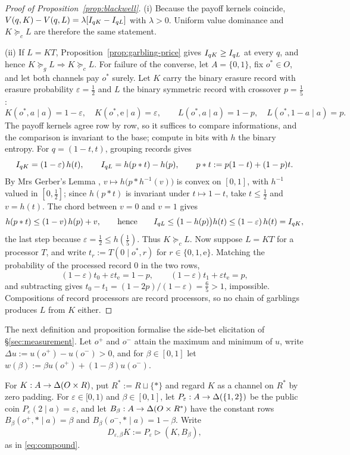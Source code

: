 \begin{proof}[Proof of Proposition~\ref{prop:blackwell}]
(i) Because the payoff kernels coincide,
$V(q,K)-V(q,L)=\lambda[I_{qK}-I_{qL}]$ with $\lambda>0$.  Uniform value dominance and
$K\succeq_cL$ are therefore the same statement.

(ii) If $L=KT$, Proposition~\ref{prop:garbling-price} gives $I_{qK}\ge I_{qL}$ at every $q$, and hence
$K\succeq_gL\Rightarrow K\succeq_cL$.  For failure of the converse, let $A=\{0,1\}$, fix $o^\ast\in O$, and let
both channels pay $o^\ast$ surely.  Let $K$ carry the binary
erasure record with erasure probability $\varepsilon=\tfrac12$ and $L$ the binary symmetric record with crossover
$p=\tfrac15$:
\[
 K(o^\ast,a\mid a)=1-\varepsilon,\quad K(o^\ast,\mathrm e\mid a)=\varepsilon,
 \qquad
 L(o^\ast,a\mid a)=1-p,\quad L(o^\ast,1-a\mid a)=p.
\]
The payoff kernels agree row by row, so it suffices to compare informations, and the comparison is invariant to the
base; compute in bits with $h$ the binary entropy.  For $q=(1-t,t)$, grouping records gives
\[
 I_{qK}=(1-\varepsilon)\,h(t),
 \qquad
 I_{qL}=h(p\ast t)-h(p),
 \qquad p\ast t:=p(1-t)+(1-p)t.
\]
By Mrs Gerber's Lemma \cite{WynerZiv1973}, $v\mapsto h\bigl(p\ast h^{-1}(v)\bigr)$ is convex on $[0,1]$, with
$h^{-1}$ valued in $[0,\tfrac12]$; since $h(p\ast t)$ is invariant under $t\mapsto1-t$, take $t\le\tfrac12$ and
$v=h(t)$.  The chord between $v=0$ and $v=1$ gives
\[
 h(p\ast t)\le(1-v)\,h(p)+v,
 \qquad\text{hence}\qquad
 I_{qL}\le\bigl(1-h(p)\bigr)h(t)\le(1-\varepsilon)\,h(t)=I_{qK},
\]
the last step because $\varepsilon=\tfrac12\le h(\tfrac15)$.  Thus $K\succeq_cL$.  Now suppose $L=KT$ for a
processor $T$, and write $t_r:=T(0\mid o^\ast,r)$ for $r\in\{0,1,\mathrm e\}$.  Matching the probability of the
processed record $0$ in the two rows,
\[
 (1-\varepsilon)t_0+\varepsilon t_{\mathrm e}=1-p,
 \qquad
 (1-\varepsilon)t_1+\varepsilon t_{\mathrm e}=p,
\]
and subtracting gives $t_0-t_1=(1-2p)/(1-\varepsilon)=\tfrac65>1$, impossible.  Compositions of record processors
are record processors, so no chain of garblings produces $L$ from $K$ either.
\end{proof}

The next definition and proposition formalise the side-bet elicitation of \S\ref{sec:measurement}.  Let $o^+$
and $o^-$ attain the maximum and minimum of $u$, write $\Delta u:=u(o^+)-u(o^-)>0$, and for $\beta\in[0,1]$ let
$w(\beta):=\beta u(o^+)+(1-\beta)u(o^-)$.

\begin{definition}\label{def:dilution}
For $K:A\to\Delta(O\times R)$, put $R^\ast:=R\sqcup\{\ast\}$ and regard $K$ as a channel on $R^\ast$ by zero
padding.  For $\varepsilon\in[0,1)$ and $\beta\in[0,1]$, let $P_\varepsilon:A\to\Delta(\{1,2\})$ be the public coin
$P_\varepsilon(2\mid a)=\varepsilon$, and let $B_\beta:A\to\Delta(O\times R^\ast)$ have the constant rows
$B_\beta(o^+,\ast\mid a)=\beta$ and $B_\beta(o^-,\ast\mid a)=1-\beta$.  Write
\[
 D_{\varepsilon,\beta}K:=P_\varepsilon\triangleright(K,B_\beta),
\]
as in \eqref{eq:compound}.
\end{definition}

